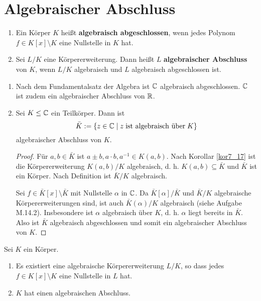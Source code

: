 \section{Algebraischer Abschluss}
\begin{definition}
	\begin{enumerate}[label=(\alph*)]
		\item Ein Körper $K$ heißt \textbf{algebraisch abgeschlossen}, wenn jedes Polynom $f \in K[x] \setminus K$ eine Nullstelle in $K$ hat.
		\item Sei $L/K$ eine Körpererweiterung. Dann heißt $L$ \textbf{algebraischer Abschluss} von $K$, wenn $L/K$ algebraisch und $L$ algebraisch abgeschlossen ist.
	\end{enumerate}
\end{definition}
\begin{beispiel}\label{beispiel8_2}
	\begin{enumerate}[label=(\arabic*)]
		\item Nach dem Fundamentalsatz der Algebra ist $\mathbb{C}$ algebraisch abgeschlossen. $\mathbb{C}$ ist zudem ein algebraischer Abschluss von $\mathbb{R}$.
		\item Sei $K \leq \mathbb{C}$ ein Teilkörper. Dann ist 
		\[\bar{K} := \{z \in \mathbb{C} \mid z \; \text{ist algebraisch über} \; K\}\]
		algebraischer Abschluss von $K$.
		\begin{proof}
			Für $a,b \in \bar{K}$ ist $a \pm b, a \cdot b, a^{-1} \in K(a,b)$. Nach Korollar \ref{kor7_17} ist die Körpererweiterung $K(a,b)/K$ algebraisch, d. h. $K(a,b) \subseteq \bar{K}$ und $\bar{K}$ ist ein Körper. Nach Definition ist $\bar{K} / K$ algebraisch. 
			
			Sei $f \in \bar{K}[x] \setminus \bar{K}$ mit Nullstelle $\alpha$ in $\mathbb{C}$. Da $\bar{K}[\alpha] / \bar{K}$ und $\bar{K}/K$ algebraische Körpererweiterungen sind, ist auch $\bar{K}(\alpha) /K$ algebraisch (siehe Aufgabe M.14.2). Insbesondere ist $\alpha$ algebraisch über $K$, d. h. $\alpha$ liegt bereits in $\bar{K}$. Also ist $\bar{K}$ algebraisch abgeschlossen und somit ein algebraischer Abschluss von $K$.
		\end{proof}
	\end{enumerate}
\end{beispiel}
\begin{thm}\label{thm8_3}
	Sei $K$ ein Körper.
	\begin{enumerate}[label=(\alph*)]
		\item Es existiert eine algebraische Körpererweiterung $L/K$, so dass jedes $f \in K[x] \setminus K$ eine Nullstelle in $L$ hat.
		\item $K$ hat einen algebraischen Abschluss. 
	\end{enumerate}
\end{thm}
